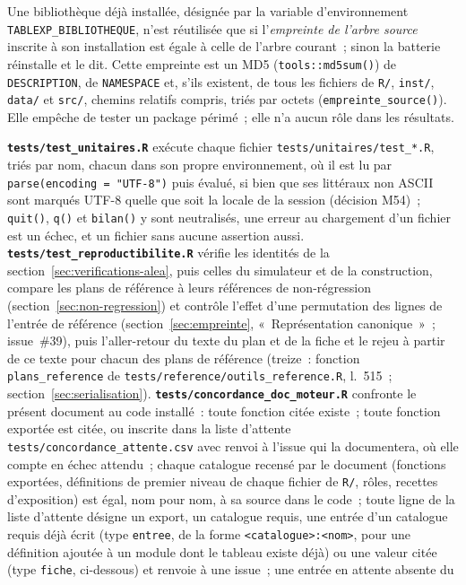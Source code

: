 \documentclass[a4paper,11pt]{article}
\newcommand{\code}[1]{\texttt{\small #1}}
\begin{document}
\noindent
Une bibliothèque déjà installée, désignée par la variable d'environnement
\code{TABLEXP\_BIBLIOTHEQUE}, n'est réutilisée que si l'\emph{empreinte de
l'arbre source} inscrite à son installation est égale à celle de l'arbre
courant~; sinon la batterie réinstalle et le dit. Cette empreinte est un MD5
(\code{tools::md5sum()}) de \code{DESCRIPTION}, de \code{NAMESPACE} et, s'ils
existent, de tous les fichiers de \code{R/}, \code{inst/}, \code{data/} et
\code{src/}, chemins relatifs compris, triés par octets
(\code{empreinte\_source()}). Elle empêche de tester un package périmé~; elle
n'a aucun rôle dans les résultats.

\medskip
\textbf{\code{tests/test\_unitaires.R}} exécute chaque fichier
\code{tests/unitaires/test\_*.R}, triés par nom, chacun dans son
propre environnement, où il est lu par \code{parse(encoding = "UTF-8")} puis
évalué, si bien que ses littéraux non ASCII sont marqués UTF-8 quelle que soit
la locale de la session (décision M54)~; \code{quit()}, \code{q()} et
\code{bilan()} y sont
neutralisés, une erreur au chargement d'un fichier est un échec, et un fichier
sans aucune assertion aussi. \textbf{\code{tests/test\_reproductibilite.R}}
vérifie les identités de la section~\ref{sec:verifications-alea}, puis celles du
simulateur et de la construction, compare les plans de référence à leurs
références de non-régression (section~\ref{sec:non-regression}) et contrôle
l'effet d'une permutation des lignes de l'entrée de référence
(section~\ref{sec:empreinte}, «~Représentation canonique~»~; issue~\#39), puis
l'aller-retour du texte du plan et de la fiche et le rejeu à partir de ce
texte pour chacun des plans de référence (treize~: fonction \code{plans\_reference} de
\code{tests/reference/outils\_reference.R}, l.~515~; section~\ref{sec:serialisation}).
\textbf{\code{tests/concordance\_doc\_moteur.R}} confronte le présent document
au code installé~: toute fonction citée existe~; toute fonction exportée est
citée, ou inscrite dans la liste d'attente \code{tests/concordance\_attente.csv}
avec renvoi à l'issue qui la documentera, où elle compte en échec attendu~;
chaque catalogue recensé par le document (fonctions exportées, définitions
de premier niveau de chaque fichier de \code{R/}, rôles, recettes
d'exposition) est égal, nom pour nom, à sa source dans le code~; toute ligne de
la liste d'attente désigne un export, un catalogue requis, une entrée d'un
catalogue requis déjà écrit (type \code{entree}, de la forme
\code{<catalogue>:<nom>}, pour une définition ajoutée à un module dont le
tableau existe déjà) ou une valeur citée (type \code{fiche}, ci-dessous) et renvoie à une issue~; une entrée en attente absente du
\end{document}
